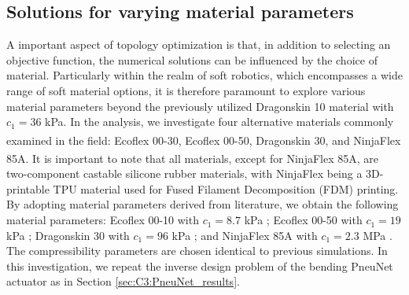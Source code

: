 \subsection{Solutions for varying material parameters}
A important aspect of topology optimization is that, in addition to selecting an objective function, the numerical solutions can be influenced by the choice of material. Particularly within the realm of soft robotics, which encompasses a wide range of soft material options, it is therefore paramount to explore various material parameters beyond the previously utilized Dragonskin 10 material with $c_1 = 36$ \si{\kilo \pascal}. In the analysis, we investigate four alternative materials commonly examined in the field: Ecoflex 00-30\textsuperscript{\scriptsize\texttrademark\!}, Ecoflex 00-50\textsuperscript{\scriptsize\texttrademark\!}, Dragonskin 30\textsuperscript{\scriptsize\texttrademark\!}, and NinjaFlex 85A\textsuperscript{\scriptsize\texttrademark\!}. It is important to note that all materials, except for NinjaFlex 85A\textsuperscript{\scriptsize\texttrademark\!}, are two-component castable silicone rubber materials, with NinjaFlex being a 3D-printable TPU material used for Fused Filament Decomposition (FDM) printing. By adopting material parameters derived from literature, we obtain the following material parameters: Ecoflex 00-10 with $c_1 = 8.7$ kPa \cite{Marechal2021Jun}; Ecoflex 00-50 with $c_1 = 19$ kPa \cite{Xavier2022Jun,Xavier2021Feb}; Dragonskin 30 with $c_1 = 96$ kPa \cite{Marechal2021Jun,Xavier2021Feb}; and NinjaFlex 85A with $c_1 = 2.3$ MPa \cite{Xavier2021Feb}. The compressibility parameters are chosen identical to previous simulations. In this investigation, we repeat the inverse design problem of the bending PneuNet actuator as in Section \ref{sec:C3:PneuNet_results}. 
%
